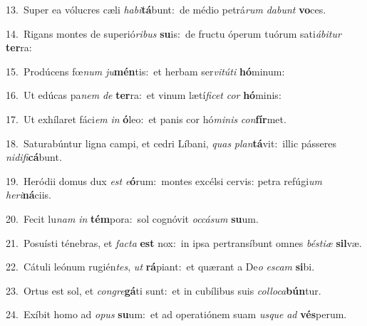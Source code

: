 {\numbfont\textcolor{\numbcolor}{13.}}~Super ea vólucres cæli \textit{ha}\-\textit{bi}\textbf{tá}bunt:~\star de médio petrá\textit{rum} \textit{da}\-\textit{bunt} \textbf{vo}\-ces.\par
{\numbfont\textcolor{\numbcolor}{14.}}~Rigans montes de superió\-\textit{ri}\-\textit{bus} \textbf{su}\-is:~\star de fructu óperum tuórum sati\-\textit{á}\-\textit{bi}\textit{tur} \textbf{ter}\-ra:\par
{\numbfont\textcolor{\numbcolor}{15.}}~Prodúcens fœ\textit{num} \textit{ju}\-\textbf{mén}tis:~\star et herbam ser\-\textit{vi}\-\textit{tú}\textit{ti} \textbf{hó}\-minum:\par
{\numbfont\textcolor{\numbcolor}{16.}}~Ut edúcas pa\textit{nem} \textit{de} \textbf{ter}\-ra:~\star et vinum lætí\-\textit{fi}\-\textit{cet} \textit{cor} \textbf{hó}\-minis:\par
{\numbfont\textcolor{\numbcolor}{17.}}~Ut exhílaret fáci\textit{em} \textit{in} \textbf{ó}\-leo:~\star et panis cor hó\-\textit{mi}\-\textit{nis} \textit{con}\-\textbf{fír}met.\par
{\numbfont\textcolor{\numbcolor}{18.}}~Saturabúntur ligna campi, et cedri Líbani, \textit{quas} \textit{plan}\-\textbf{tá}vit:~\star illic pásseres \textit{ni}\-\textit{di}\textit{fi}\textbf{cá}bunt.\par
{\numbfont\textcolor{\numbcolor}{19.}}~Heródii domus dux \textit{est} \textit{e}\-\textbf{ó}rum:~\star montes excélsi cervis: petra refúgi\textit{um} \textit{he}\-\textit{ri}\textbf{ná}ciis.\par
{\numbfont\textcolor{\numbcolor}{20.}}~Fecit lu\textit{nam} \textit{in} \textbf{tém}\-pora:~\star sol cognóvit \textit{oc}\-\textit{cá}\textit{sum} \textbf{su}\-um.\par
{\numbfont\textcolor{\numbcolor}{21.}}~Posuísti ténebras, et \textit{fac}\-\textit{ta} \textbf{est} nox:~\star in ipsa pertransíbunt omnes \textit{bés}\-\textit{ti}\textit{æ} \textbf{sil}\-væ.\par
{\numbfont\textcolor{\numbcolor}{22.}}~Cátuli leónum rugién\-\textit{tes}\-, \textit{ut} \textbf{rá}\-piant:~\star et quærant a De\textit{o} \textit{es}\-\textit{cam} \textbf{si}\-bi.\par
{\numbfont\textcolor{\numbcolor}{23.}}~Ortus est sol, et \textit{con}\-\textit{gre}\textbf{gá}ti sunt:~\star et in cubílibus suis \textit{col}\-\textit{lo}\textit{ca}\textbf{bún}tur.\par
{\numbfont\textcolor{\numbcolor}{24.}}~Exíbit homo ad \textit{o}\-\textit{pus} \textbf{su}\-um:~\star et ad operatiónem suam \textit{us}\-\textit{que} \textit{ad} \textbf{vés}\-perum.\par
